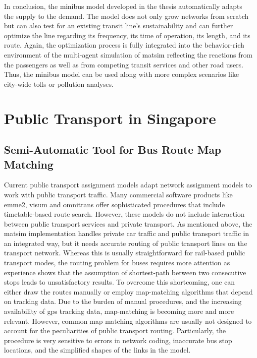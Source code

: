 In conclusion, the minibus model developed in the thesis automatically adapts the supply to the demand. The model does not only grow networks from scratch but can also test for an existing transit line's sustainability and can further optimize the line regarding its frequency, its time of operation, its length, and its route. Again, the optimization process is fully integrated into the behavior-rich environment of the multi-agent simulation of \gls{matsim} reflecting the reactions from the passengers as well as from competing transit services and other road users. Thus, the minibus model can be used along with more complex scenarios like city-wide tolls or pollution analyses.

\section{Public Transport in Singapore}
\subsection{Semi-Automatic Tool for Bus Route Map Matching}
\label{sec:SemiTool}
Current public transport assignment models adapt network assignment models to work with public transport traffic. Many commercial software products like \gls{emme2}, \gls{visum} and \gls{omnitrans} offer sophisticated procedures that include timetable-based route search. However, these models do not include interaction between public transport services and private transport. As mentioned above, the \gls{matsim} implementation handles private car traffic and public transport traffic in an integrated way, but it needs accurate routing of public transport lines on the transport network. Whereas this is usually straightforward for rail-based public transport modes, the routing problem for buses requires more attention as experience shows that the assumption of shortest-path between two consecutive stops leads to unsatisfactory results. To overcome this shortcoming, one can either draw the routes manually or employ map-matching algorithms that depend on tracking data. Due to the burden of manual procedures, and the increasing availability of \gls{gps} tracking data, map-matching is becoming more and more relevant. However, common map matching algorithms are usually not designed to account for the peculiarities of public transport routing. Particularly, the procedure is very sensitive to errors in network coding, inaccurate bus stop locations, and the simplified shapes of the links in the model.


